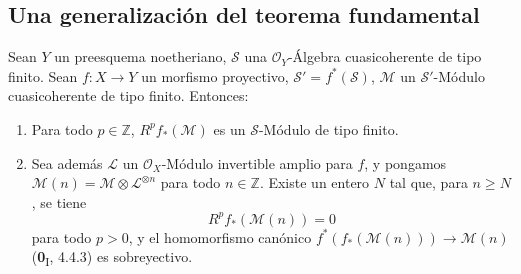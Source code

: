 \subsection{Una generalización del teorema fundamental}
\label{subsection:III.2.4}
\label{subsection:III.2.4-fr}

\begin{theorem}[2.4.1]
\label{III.2.4.1-fr}
Sean $Y$ un preesquema noetheriano, $\mathcal S$ una
$\mathcal O_Y$-Álgebra cuasicoherente de tipo finito. Sean
$f:X\to Y$ un morfismo proyectivo, $\mathcal S'=f^*(\mathcal S)$,
$\mathcal M$ un $\mathcal S'$-Módulo cuasicoherente de tipo finito.
Entonces:
\begin{enumerate}
\item[\textup{(i)}] Para todo $p\in\mathbb Z$, $R^pf_*(\mathcal M)$ es un
$\mathcal S$-Módulo de tipo finito.
\item[\textup{(ii)}] Sea además $\mathcal L$ un $\mathcal O_X$-Módulo invertible
amplio para $f$, y pongamos
$\mathcal M(n)=\mathcal M\otimes\mathcal L^{\otimes n}$ para todo
$n\in\mathbb Z$. Existe un entero $N$ tal que, para $n\geq N$, se tiene
\[
R^pf_*(\mathcal M(n))=0
\tag{2.4.1.1}\label{III.2.4.1.1-fr}
\]
para todo $p>0$, y el homomorfismo canónico
$f^*(f_*(\mathcal M(n)))\longrightarrow\mathcal M(n)$
\textup{(\textbf{0}\textsubscript{I}, 4.4.3)} es sobreyectivo.
\end{enumerate}
\end{theorem}

